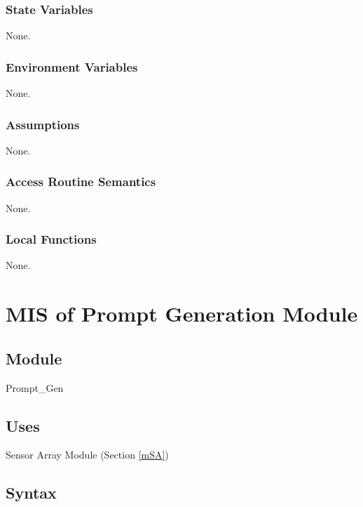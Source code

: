 \documentclass[12pt, titlepage]{article}
\begin{document}
\subsubsection{State Variables}

None.

\subsubsection{Environment Variables}

None.

\subsubsection{Assumptions}

None.

\subsubsection{Access Routine Semantics}

None.

\subsubsection{Local Functions}

None.

\newpage




\section{MIS of Prompt Generation Module} \label{mPG} 

\subsection{Module}

Prompt\_Gen

\subsection{Uses}

Sensor Array Module (Section \ref{mSA})

\subsection{Syntax}
\end{document}
